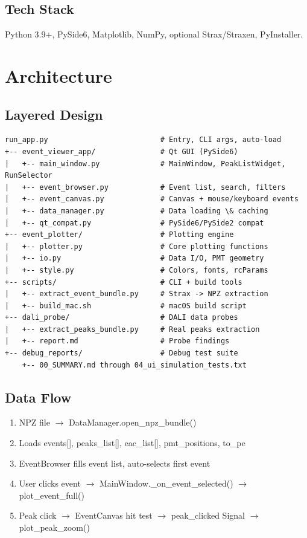 \documentclass[12pt,a4paper]{article}
\begin{document}
\subsection{Tech Stack}
Python 3.9+, PySide6, Matplotlib, NumPy, optional Strax/Straxen, PyInstaller.

\section{Architecture}

\subsection{Layered Design}
\begin{lstlisting}[language=text]
run_app.py                          # Entry, CLI args, auto-load
+-- event_viewer_app/               # Qt GUI (PySide6)
|   +-- main_window.py              # MainWindow, PeakListWidget, RunSelector
|   +-- event_browser.py            # Event list, search, filters
|   +-- event_canvas.py             # Canvas + mouse/keyboard events
|   +-- data_manager.py             # Data loading \& caching
|   +-- qt_compat.py                # PySide6/PySide2 compat
+-- event_plotter/                  # Plotting engine
|   +-- plotter.py                  # Core plotting functions
|   +-- io.py                       # Data I/O, PMT geometry
|   +-- style.py                    # Colors, fonts, rcParams
+-- scripts/                        # CLI + build tools
|   +-- extract_event_bundle.py     # Strax -> NPZ extraction
|   +-- build_mac.sh                # macOS build script
+-- dali_probe/                     # DALI data probes
|   +-- extract_peaks_bundle.py     # Real peaks extraction
|   +-- report.md                   # Probe findings
+-- debug_reports/                  # Debug test suite
    +-- 00_SUMMARY.md through 04_ui_simulation_tests.txt
\end{lstlisting}

\subsection{Data Flow}
\begin{enumerate}[itemsep=2pt]
\item NPZ file $\rightarrow$ DataManager.open\_npz\_bundle()
\item Loads events[], peaks\_list[], eac\_list[], pmt\_positions, to\_pe
\item EventBrowser fills event list, auto-selects first event
\item User clicks event $\rightarrow$ MainWindow.\_on\_event\_selected() $\rightarrow$ plot\_event\_full()
\item Peak click $\rightarrow$ EventCanvas hit test $\rightarrow$ peak\_clicked Signal $\rightarrow$ plot\_peak\_zoom()
\end{enumerate}
\end{document}
